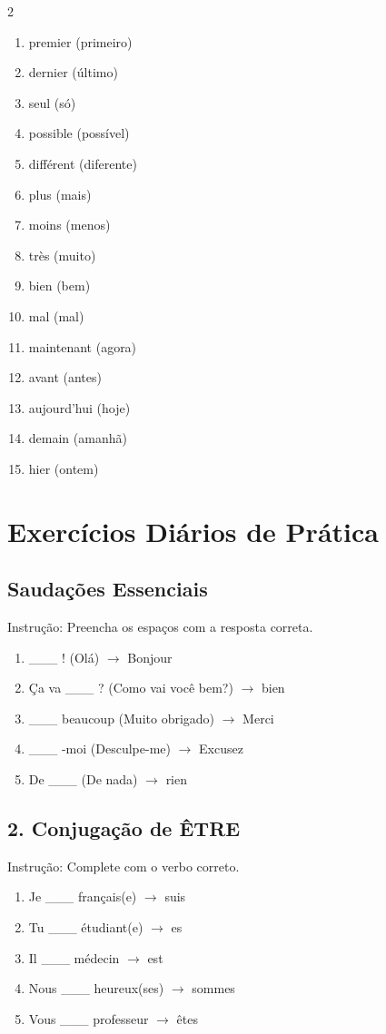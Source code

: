 \documentclass[a4paper,12pt]{article}
\begin{document}
\begin{multicols}{2}
\begin{enumerate}[label=\arabic*., start=51]
    \item premier (primeiro)
    \item dernier (último)
    \item seul (só)
    \item possible (possível)
    \item différent (diferente)
    \item plus (mais)
    \item moins (menos)
    \item très (muito)
    \item bien (bem)
    \item mal (mal)
    \item maintenant (agora)
    \item avant (antes)
    \item aujourd’hui (hoje)
    \item demain (amanhã)
    \item hier (ontem)
\end{enumerate}
\end{multicols}

\section{Exercícios Diários de Prática}

\subsection*{Saudações Essenciais}
Instrução: Preencha os espaços com a resposta correta.
\begin{enumerate}
    \item \_\_\_ ! (Olá) $\to$ Bonjour
    \item Ça va \_\_\_ ? (Como vai você bem?) $\to$ bien
    \item \_\_\_ beaucoup (Muito obrigado) $\to$ Merci
    \item \_\_\_ -moi (Desculpe-me) $\to$ Excusez
    \item De \_\_\_ (De nada) $\to$ rien
\end{enumerate}

\subsection*{2. Conjugação de ÊTRE}
Instrução: Complete com o verbo correto.
\begin{enumerate}
    \item Je \_\_\_ français(e) $\to$ suis
    \item Tu \_\_\_ étudiant(e) $\to$ es
    \item Il \_\_\_ médecin $\to$ est
    \item Nous \_\_\_ heureux(ses) $\to$ sommes
    \item Vous \_\_\_ professeur $\to$ êtes
\end{enumerate}
\end{document}
